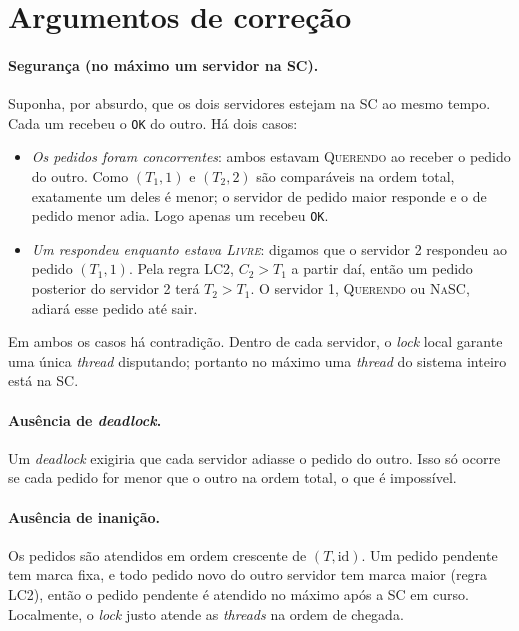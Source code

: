 \documentclass[11pt,a4paper]{article}
\newcommand{\msg}[1]{\texttt{#1}}
\newcommand{\estado}[1]{\textup{\textsc{#1}}}
\begin{document}
\section{Argumentos de correção}
\label{sec:correcao}

\paragraph{Segurança (no máximo um servidor na SC).}
Suponha, por absurdo, que os dois servidores estejam na SC ao mesmo tempo. Cada um
recebeu o \msg{OK} do outro. Há dois casos:
\begin{itemize}
  \item \emph{Os pedidos foram concorrentes}: ambos estavam \estado{Querendo} ao
        receber o pedido do outro. Como $(T_1,1)$ e $(T_2,2)$ são comparáveis na
        ordem total, exatamente um deles é menor; o servidor de pedido maior
        responde e o de pedido menor adia. Logo apenas um recebeu \msg{OK}.
  \item \emph{Um respondeu enquanto estava \estado{Livre}}: digamos que o servidor
        2 respondeu ao pedido $(T_1,1)$. Pela regra LC2, $C_2 > T_1$ a partir daí,
        então um pedido posterior do servidor 2 terá $T_2 > T_1$. O servidor 1,
        \estado{Querendo} ou \estado{NaSC}, adiará esse pedido até sair.
\end{itemize}
Em ambos os casos há contradição. Dentro de cada servidor, o \emph{lock} local
garante uma única \emph{thread} disputando; portanto no máximo uma \emph{thread} do
sistema inteiro está na SC.

\paragraph{Ausência de \emph{deadlock}.}
Um \emph{deadlock} exigiria que cada servidor adiasse o pedido do outro. Isso só
ocorre se cada pedido for menor que o outro na ordem total, o que é impossível.

\paragraph{Ausência de inanição.}
Os pedidos são atendidos em ordem crescente de $(T, \text{id})$. Um pedido pendente
tem marca fixa, e todo pedido novo do outro servidor tem marca maior (regra LC2),
então o pedido pendente é atendido no máximo após a SC em curso. Localmente, o
\emph{lock} justo atende as \emph{threads} na ordem de chegada.
\end{document}
